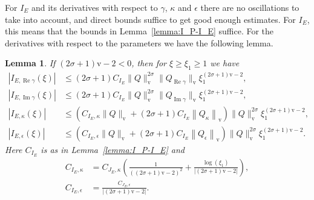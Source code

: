 \documentclass[11pt]{article}
\DeclareMathOperator{\real}{Re}
\DeclareMathOperator{\imag}{Im}
\newcommand{\normv}{\mathrm{v}}
\newtheorem{lemma}[definition]{Lemma}
\begin{document}
For \(I_{E}\) and its derivatives with respect to \(\gamma\),
\(\kappa\) and \(\epsilon\) there are no oscillations to take into
account, and direct bounds suffice to get good enough estimates. For
\(I_{E}\), this means that the bounds in Lemma~\ref{lemma:I_P-I_E}
suffice. For the derivatives with respect to the parameters we have
the following lemma.
\begin{lemma}\label{lemma:I-E-bounds}
  If \((2\sigma + 1)\normv - 2 < 0\), then for
  \(\xi \geq \xi_{1} \geq 1\) we have
  \begin{align*}
    |I_{E,\real\gamma}(\xi)|
    &\leq (2\sigma + 1)C_{I_{E}}\|Q\|_{\normv}^{2\sigma}
      \|Q_{\real\gamma}\|_\normv\xi_{1}^{(2\sigma + 1)\normv - 2},\\
    |I_{E,\imag\gamma}(\xi)|
    &\leq (2\sigma + 1)C_{I_{E}}\|Q\|_{\normv}^{2\sigma}
      \|Q_{\imag\gamma}\|_\normv\xi_{1}^{(2\sigma + 1)\normv - 2},\\
    \left|I_{E,\kappa}(\xi)\right|
    &\leq (
      C_{I_{E},\kappa}\|Q\|_{\normv}
      + (2\sigma + 1)C_{I_{E}}\left\|Q_{\kappa}\right\|_{\normv}
      )\|Q\|_{\normv}^{2\sigma}\xi_{1}^{(2\sigma + 1)\normv - 2},\\
    \left|I_{E,\epsilon}(\xi)\right|
    &\leq (
      C_{I_{E},\epsilon}\|Q\|_{\normv}
      + (2\sigma + 1)C_{I_{E}}\left\|Q_{\epsilon}\right\|_{\normv}
      )\|Q\|_{\normv}^{2\sigma}\xi_{1}^{(2\sigma + 1)\normv - 2}.
  \end{align*}
  Here \(C_{I_{E}}\) is as in Lemma~\ref{lemma:I_P-I_E} and
  \begin{align*}
    C_{I_{E},\kappa}
    &= C_{J_{E},\kappa}\left(
      \frac{1}{((2\sigma + 1)\normv - 2)^2}
      + \frac{\log(\xi_{1})}{|(2\sigma + 1)\normv - 2|}
      \right),\\
    C_{I_{E},\epsilon}
    &= \frac{C_{J_{E},\epsilon}}{|(2\sigma + 1)\normv - 2|}.
  \end{align*}
\end{lemma}
\end{document}
